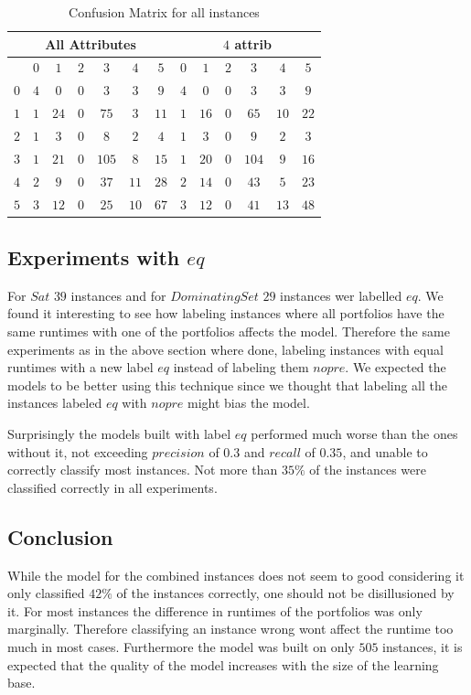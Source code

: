 \begin{table}[h]
	\center
	\begin{tabular}{|c|cccccc|cccccc|}
		\hline\multicolumn{7}{|c|}{All Attributes} &\multicolumn{6}{|c|}{$4$ attrib}\\
		\hline &$0$&$1$&$2$&$3$&$4$&$5$&$0$&$1$&$2$&$3$&$4$&$5$\\
		\hline $0$ & $4$ & $0$ & $0$ & $3$ & $3$ & $9$ & $4$ & $0$ & $0$ & $3$ & $3$ & $9$ \\
					 $1$ & $1$ & $24$& $0$ & $75$& $3$ & $11$& $1$ & $16$& $0$ & $65$& $10$& $22$\\
           $2$ & $1$ & $3$ & $0$ & $8$ & $2$ & $4$ & $1$ & $3$ & $0$ & $9$ & $2$ & $3$\\
				   $3$ & $1$ & $21$& $0$ &$105$& $8$ & $15$& $1$ & $20$& $0$ &$104$& $9$ & $16$\\
				   $4$ & $2$ & $9$ & $0$ & $37$& $11$& $28$& $2$ & $14$& $0$ & $43$& $5$ & $23$\\
				   $5$ & $3$ & $12$& $0$ & $25$& $10$& $67$& $3$ & $12$& $0$ & $41$& $13$& $48$\\
		\hline
	\end{tabular}
	\caption{Confusion Matrix for all instances}
	\label{tbl:cmbCM}
\end{table}

\subsection{Experiments with $eq$}
For $Sat$ $39$ instances and for $Dominating Set$ $29$ instances wer labelled $eq$. We found it interesting to see how labeling instances where all portfolios have the same runtimes with one of the portfolios affects the model. Therefore the same experiments as in the above section where done, labeling instances with equal runtimes with a new label $eq$ instead of labeling them $nopre$. We expected the models to be better using this technique since we thought that labeling all the instances labeled $eq$ with $nopre$ might bias the model.

Surprisingly the models built with label $eq$ performed much worse than the ones without it, not exceeding $precision$ of $0.3$ and $recall$ of $0.35$, and unable to correctly classify most instances. Not more than $35\%$ of the instances were classified correctly in all experiments.

\subsection{Conclusion}
While the model for the combined instances does not seem to good considering it only classified $42\%$ of the instances correctly, one should not be disillusioned by it. For most instances the difference in runtimes of the portfolios was only marginally. Therefore classifying an instance wrong wont affect the runtime too much in most cases. 
Furthermore the model was built on only $505$ instances, it is expected that the quality of the model increases with the size of the learning base.

